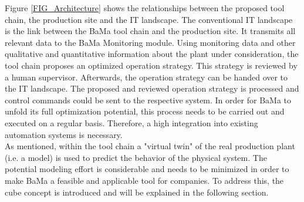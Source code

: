 \documentclass[3p,times,procedia,twocolumn,twoside]{elsarticle}
\begin{document}
Figure \ref{FIG_Architecture} shows the relationships between the proposed tool chain, the production site and the IT landscape. The conventional IT landscape is the link between the BaMa tool chain and the production site. It transmits all relevant data to the BaMa Monitoring module. Using monitoring data and other qualitative and quantitative information about the plant under consideration, the tool chain proposes an optimized operation strategy. This strategy is reviewed by a human supervisor. Afterwards, the operation strategy can be handed over to the IT landscape. The proposed and reviewed operation strategy is processed and  control commands could be sent to the respective system. In order for BaMa to unfold its full optimization potential, this process needs to be carried out and executed on a regular basis. Therefore, a high integration into existing automation systems is necessary. \\
As mentioned, within the tool chain a "virtual twin" of the real production plant (i.e. a model) is used to predict the behavior of the physical system. The potential modeling effort is considerable and needs to be minimized in order to make BaMa a feasible and applicable tool for companies. To address this, the cube concept is introduced and will be explained in the following section.
\end{document}
